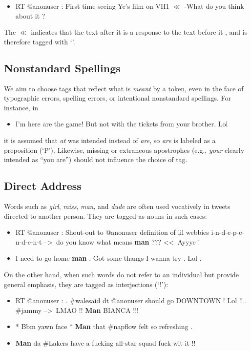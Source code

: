 \documentclass[11pt,letterpaper]{article}
\begin{document}
\begin{itemize}
\item RT @anonuser : First time seeing Ye's film on VH1 $\ll$ -What do you think about it ?  
\end{itemize}
\noindent The \emph{$\ll$} indicates that the text after it is a response to the text before it \cite{collister-12}, and is therefore tagged with `\texttildelow'.


\subsection{Nonstandard Spellings}

We aim to choose tags that reflect what is \emph{meant} by a token, even in the face of typographic errors, spelling errors, or intentional nonstandard spellings.
For instance, in

\begin{itemize}
\item I'm here are the game! But not with the tickets from your brother. Lol
\end{itemize}

\noindent it is assumed that \emph{at} was intended instead of \emph{are}, so \emph{are} is labeled as a preposition (`P'). Likewise, missing or extraneous apostrophes (e.g., \emph{your} clearly intended as ``you are'') should not influence the choice of tag.

\subsection{Direct Address}

Words such as \emph{girl}, \emph{miss}, \emph{man}, and \emph{dude} are often used vocatively in tweets directed to another person. They are tagged as nouns in such cases:
\begin{itemize}
\item RT @anonuser : Shout-out to @anonuser definition of lil webbies i-n-d-e-p-e-n-d-e-n-t --\textgreater\ do you know what means \textbf{man} ??? \textless\textless\ Ayyye !
\item I need to go home \textbf{man} . Got some thangs I wanna try . Lol .
\end{itemize}

\noindent On the other hand, when such words do not refer to an individual but provide general emphasis, they are tagged as interjections (`!'):
\begin{itemize}
\item RT @anonuser : . \#walesaid dt @anonuser should go DOWNTOWN ! Lol !!.. \#jammy --\textgreater\texttildelow\ LMAO !! \textbf{Man} BIANCA !!!
\item * Bbm yawn face * \textbf{Man} that \#napflow felt so refreshing .
\item \textbf{Man} da \#Lakers have a fucking all-star squad fuck wit it !!
\end{itemize}

{ %


}
\end{document}
